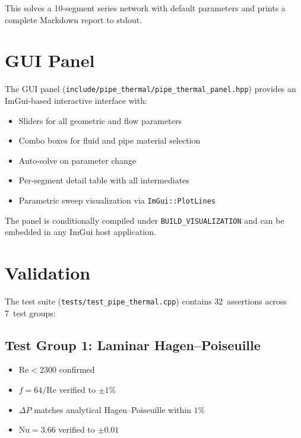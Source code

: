 \documentclass[11pt]{article}
\begin{document}
This solves a 10-segment series network with default parameters and
prints a complete Markdown report to stdout.

\section{GUI Panel}
\label{sec:gui}

The GUI panel (\texttt{include/pipe\_thermal/pipe\_thermal\_panel.hpp})
provides an ImGui-based interactive interface with:

\begin{itemize}
  \item Sliders for all geometric and flow parameters
  \item Combo boxes for fluid and pipe material selection
  \item Auto-solve on parameter change
  \item Per-segment detail table with all intermediates
  \item Parametric sweep visualization via \texttt{ImGui::PlotLines}
\end{itemize}

The panel is conditionally compiled under \texttt{BUILD\_VISUALIZATION}
and can be embedded in any ImGui host application.

\section{Validation}
\label{sec:validation}

The test suite (\texttt{tests/test\_pipe\_thermal.cpp}) contains 32~assertions
across 7~test groups:

\subsection{Test Group 1: Laminar Hagen--Poiseuille}

\begin{itemize}
  \item $\mathrm{Re} < 2300$ confirmed
  \item $f = 64/\mathrm{Re}$ verified to $\pm 1\%$
  \item $\Delta P$ matches analytical Hagen--Poiseuille within $1\%$
  \item $\mathrm{Nu} = 3.66$ verified to $\pm 0.01$
\end{itemize}
\end{document}
